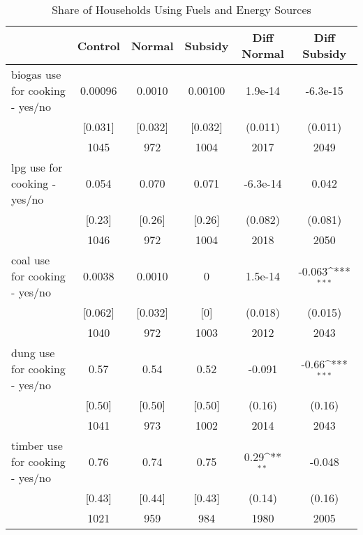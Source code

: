 \begin{table}[htbp]\centering
\def\sym#1{\ifmmode^{#1}\else\(^{#1}\)\fi}
\caption{Share of Households Using Fuels and Energy Sources \label{tab:"balance"}}
\begin{tabular*}{0.9\hsize}{@{\hskip\tabcolsep\extracolsep\fill}l*{1}{ccccc}}
\toprule
                                &  Control&   Normal&  Subsidy&Diff Normal         &Diff Subsidy         \\
\midrule
biogas use for cooking  - yes/no&  0.00096&   0.0010&  0.00100&  1.9e-14         & -6.3e-15         \\
                                &  [0.031]&  [0.032]&  [0.032]&  (0.011)         &  (0.011)         \\
                                &     1045&      972&     1004&     2017         &     2049         \\
lpg use for cooking  - yes/no   &    0.054&    0.070&    0.071& -6.3e-14         &    0.042         \\
                                &   [0.23]&   [0.26]&   [0.26]&  (0.082)         &  (0.081)         \\
                                &     1046&      972&     1004&     2018         &     2050         \\
coal use for cooking  - yes/no  &   0.0038&   0.0010&        0&  1.5e-14         &   -0.063\sym{***}\\
                                &  [0.062]&  [0.032]&      [0]&  (0.018)         &  (0.015)         \\
                                &     1040&      972&     1003&     2012         &     2043         \\
dung use for cooking  - yes/no  &     0.57&     0.54&     0.52&   -0.091         &    -0.66\sym{***}\\
                                &   [0.50]&   [0.50]&   [0.50]&   (0.16)         &   (0.16)         \\
                                &     1041&      973&     1002&     2014         &     2043         \\
timber use for cooking  - yes/no&     0.76&     0.74&     0.75&     0.29\sym{**} &   -0.048         \\
                                &   [0.43]&   [0.44]&   [0.43]&   (0.14)         &   (0.16)         \\
                                &     1021&      959&      984&     1980         &     2005         \\

\end{tabular*}
\end{table}
